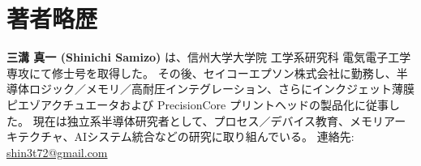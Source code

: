 \documentclass[conference]{IEEEtran}
\begin{document}
\section*{著者略歴}
\noindent\textbf{三溝 真一 (Shinichi Samizo)} は、信州大学大学院 工学系研究科 電気電子工学専攻にて修士号を取得した。
その後、セイコーエプソン株式会社に勤務し、半導体ロジック／メモリ／高耐圧インテグレーション、さらにインクジェット薄膜ピエゾアクチュエータおよび PrecisionCore プリントヘッドの製品化に従事した。
現在は独立系半導体研究者として、プロセス／デバイス教育、メモリアーキテクチャ、AIシステム統合などの研究に取り組んでいる。
連絡先: \href{mailto:shin3t72@gmail.com}{shin3t72@gmail.com}
\end{document}
